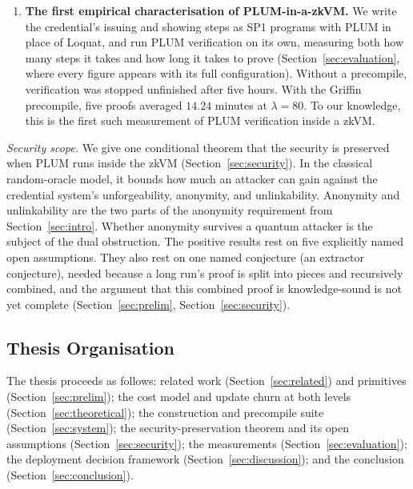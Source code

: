 \begin{enumerate}
  \item \textbf{The first empirical characterisation of PLUM-in-a-zkVM.} We write the credential's issuing and showing steps as SP1 programs with PLUM in place of Loquat, and run PLUM verification on its own, measuring both how many steps it takes and how long it takes to prove (Section~\ref{sec:evaluation}, where every figure appears with its full configuration). Without a precompile, verification was stopped unfinished after five hours. With the Griffin precompile, five proofs averaged $14.24$ minutes at $\lambda=80$. To our knowledge, this is the first such measurement of PLUM verification inside a zkVM.
\end{enumerate}

\noindent\emph{Security scope.} We give one conditional theorem that the security is preserved when PLUM runs inside the zkVM (Section~\ref{sec:security}). In the classical random-oracle model, it bounds how much an attacker can gain against the credential system's unforgeability, anonymity, and unlinkability. Anonymity and unlinkability are the two parts of the anonymity requirement from Section~\ref{sec:intro}. Whether anonymity survives a quantum attacker is the subject of the dual obstruction. The positive results rest on five explicitly named open assumptions. They also rest on one named conjecture (an extractor conjecture), needed because a long run's proof is split into pieces and recursively combined, and the argument that this combined proof is knowledge-sound is not yet complete (Section~\ref{sec:prelim}, Section~\ref{sec:security}).

\subsection{Thesis Organisation}
The thesis proceeds as follows: related work (Section~\ref{sec:related}) and primitives (Section~\ref{sec:prelim}); the cost model and update churn at both levels (Section~\ref{sec:theoretical}); the construction and precompile suite (Section~\ref{sec:system}); the security-preservation theorem and its open assumptions (Section~\ref{sec:security}); the measurements (Section~\ref{sec:evaluation}); the deployment decision framework (Section~\ref{sec:discussion}); and the conclusion (Section~\ref{sec:conclusion}).